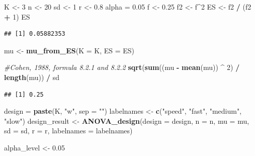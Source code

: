 \documentclass[
]{book}
\newenvironment{Shaded}{\begin{snugshade}}{\end{snugshade}}
\newcommand{\CommentTok}[1]{\textcolor[rgb]{0.56,0.35,0.01}{\textit{#1}}}
\newcommand{\DataTypeTok}[1]{\textcolor[rgb]{0.13,0.29,0.53}{#1}}
\newcommand{\DecValTok}[1]{\textcolor[rgb]{0.00,0.00,0.81}{#1}}
\newcommand{\FloatTok}[1]{\textcolor[rgb]{0.00,0.00,0.81}{#1}}
\newcommand{\KeywordTok}[1]{\textcolor[rgb]{0.13,0.29,0.53}{\textbf{#1}}}
\newcommand{\NormalTok}[1]{#1}
\newcommand{\OperatorTok}[1]{\textcolor[rgb]{0.81,0.36,0.00}{\textbf{#1}}}
\newcommand{\StringTok}[1]{\textcolor[rgb]{0.31,0.60,0.02}{#1}}
\begin{document}
\begin{Shaded}
\begin{Highlighting}[]
\NormalTok{K <-}\StringTok{ }\DecValTok{3}
\NormalTok{n <-}\StringTok{ }\DecValTok{20}
\NormalTok{sd <-}\StringTok{ }\DecValTok{1}
\NormalTok{r <-}\StringTok{ }\FloatTok{0.8}
\NormalTok{alpha =}\StringTok{ }\FloatTok{0.05}
\NormalTok{f <-}\StringTok{ }\FloatTok{0.25}
\NormalTok{f2 <-}\StringTok{ }\NormalTok{f}\OperatorTok{^}\DecValTok{2}
\NormalTok{ES <-}\StringTok{ }\NormalTok{f2 }\OperatorTok{/}\StringTok{ }\NormalTok{(f2 }\OperatorTok{+}\StringTok{ }\DecValTok{1}\NormalTok{)}
\NormalTok{ES}
\end{Highlighting}
\end{Shaded}

\begin{verbatim}
## [1] 0.05882353
\end{verbatim}

\begin{Shaded}
\begin{Highlighting}[]
\NormalTok{mu <-}\StringTok{ }\KeywordTok{mu_from_ES}\NormalTok{(}\DataTypeTok{K =}\NormalTok{ K, }\DataTypeTok{ES =}\NormalTok{ ES)}

\CommentTok{#Cohen, 1988, formula 8.2.1 and 8.2.2}
\KeywordTok{sqrt}\NormalTok{(}\KeywordTok{sum}\NormalTok{((mu }\OperatorTok{-}\StringTok{ }\KeywordTok{mean}\NormalTok{(mu)) }\OperatorTok{^}\StringTok{ }\DecValTok{2}\NormalTok{) }\OperatorTok{/}\StringTok{ }\KeywordTok{length}\NormalTok{(mu)) }\OperatorTok{/}\StringTok{ }\NormalTok{sd }
\end{Highlighting}
\end{Shaded}

\begin{verbatim}
## [1] 0.25
\end{verbatim}

\begin{Shaded}
\begin{Highlighting}[]
\NormalTok{design =}\StringTok{ }\KeywordTok{paste}\NormalTok{(K, }\StringTok{"w"}\NormalTok{, }\DataTypeTok{sep =} \StringTok{""}\NormalTok{)}
\NormalTok{labelnames <-}\StringTok{ }\KeywordTok{c}\NormalTok{(}\StringTok{"speed"}\NormalTok{, }\StringTok{"fast"}\NormalTok{, }\StringTok{"medium"}\NormalTok{, }\StringTok{"slow"}\NormalTok{)}
\NormalTok{design_result <-}\StringTok{ }\KeywordTok{ANOVA_design}\NormalTok{(}\DataTypeTok{design =}\NormalTok{ design,}
                   \DataTypeTok{n =}\NormalTok{ n, }
                   \DataTypeTok{mu =}\NormalTok{ mu, }
                   \DataTypeTok{sd =}\NormalTok{ sd, }
                   \DataTypeTok{r =}\NormalTok{ r, }
                   \DataTypeTok{labelnames =}\NormalTok{ labelnames)}

\NormalTok{alpha_level <-}\StringTok{ }\FloatTok{0.05}
\end{Highlighting}
\end{Shaded}
\end{document}
